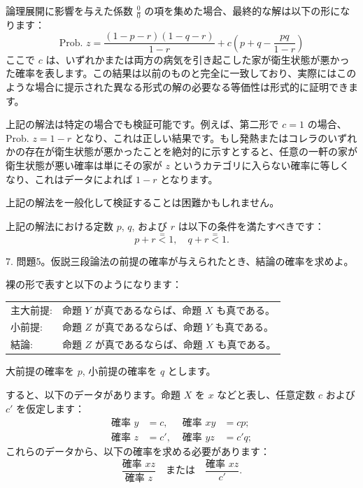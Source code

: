 \documentclass[a4paper,11pt,openany]{ltjsbook}
\begin{document}
論理展開に影響を与えた係数 $\frac{0}{0}$ の項を集めた場合、最終的な解は以下の形になります：
\[
\text{Prob. } z = \frac{(1-p-r)(1-q-r)}{1-r} + c\left(p+q-\frac{pq}{1-r}\right)
\]
ここで $c$ は、いずれかまたは両方の病気を引き起こした家が衛生状態が悪かった確率を表します。この結果は以前のものと完全に一致しており、実際にはこのような場合に提示された異なる形式の解の必要なる等価性は形式的に証明できます。

上記の解法は特定の場合でも検証可能です。例えば、第二形で $c = 1$ の場合、Prob. $z = 1-r$ となり、これは正しい結果です。もし発熱またはコレラのいずれかの存在が衛生状態が悪かったことを絶対的に示すとすると、任意の一軒の家が衛生状態が悪い確率は単にその家が $z$ というカテゴリに入らない確率に等しくなり、これはデータによれば $1-r$ となります。

上記の解法を一般化して検証することは困難かもしれません。

上記の解法における定数 $p$, $q$, および $r$ は以下の条件を満たすべきです：
\[
p + r \stackrel{=}{<} 1, \quad q + r \stackrel{=}{<} 1.
\]

7. 問題5。仮説三段論法の前提の確率が与えられたとき、結論の確率を求めよ。

裸の形で表すと以下のようになります：

\begin{tabular}{ll}
  主大前提: & 命題 $Y$ が真であるならば、命題 $X$ も真である。\\
  小前提: & 命題 $Z$ が真であるならば、命題 $Y$ も真である。\\
  結論:    & 命題 $Z$ が真であるならば、命題 $X$ も真である。
\end{tabular}

大前提の確率を $p$, 小前提の確率を $q$ とします。

すると、以下のデータがあります。命題 $X$ を $x$ などと表し、任意定数 $c$ および $c'$ を仮定します：
\begin{align*}
  \text{確率 } y &= c, & \text{ 確率 } xy &= cp;\\
  \text{確率 } z &= c', & \text{ 確率 } yz &= c'q;
\end{align*}
これらのデータから、以下の確率を求める必要があります：
\[
  \frac{\text{確率 } xz}{\text{確率 } z} \quad \text{または} \quad \frac{\text{確率 } xz}{c'}.
\]
\end{document}
